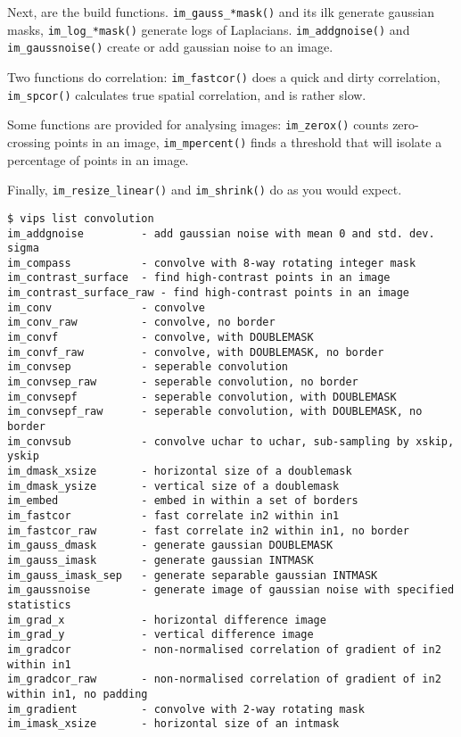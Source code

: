 Next, are the build functions. \verb+im_gauss_*mask()+ and its ilk
generate gaussian masks, \verb+im_log_*mask()+ generate logs of Laplacians.
\verb+im_addgnoise()+ and \verb+im_gaussnoise()+ create or add gaussian
noise to an image.

Two functions do correlation: \verb+im_fastcor()+ does a quick and dirty
correlation, \verb+im_spcor()+ calculates true spatial correlation, and is
rather slow.

Some functions are provided for analysing images: \verb+im_zerox()+ counts
zero-crossing points in an image, \verb+im_mpercent()+ finds a threshold
that will isolate a percentage of points in an image.

Finally, \verb+im_resize_linear()+ and \verb+im_shrink()+ do as you would
expect.

\begin{fig2}
\begin{verbatim}
$ vips list convolution
im_addgnoise         - add gaussian noise with mean 0 and std. dev. sigma
im_compass           - convolve with 8-way rotating integer mask
im_contrast_surface  - find high-contrast points in an image
im_contrast_surface_raw - find high-contrast points in an image
im_conv              - convolve
im_conv_raw          - convolve, no border
im_convf             - convolve, with DOUBLEMASK
im_convf_raw         - convolve, with DOUBLEMASK, no border
im_convsep           - seperable convolution
im_convsep_raw       - seperable convolution, no border
im_convsepf          - seperable convolution, with DOUBLEMASK
im_convsepf_raw      - seperable convolution, with DOUBLEMASK, no border
im_convsub           - convolve uchar to uchar, sub-sampling by xskip, yskip
im_dmask_xsize       - horizontal size of a doublemask
im_dmask_ysize       - vertical size of a doublemask
im_embed             - embed in within a set of borders
im_fastcor           - fast correlate in2 within in1
im_fastcor_raw       - fast correlate in2 within in1, no border
im_gauss_dmask       - generate gaussian DOUBLEMASK
im_gauss_imask       - generate gaussian INTMASK
im_gauss_imask_sep   - generate separable gaussian INTMASK
im_gaussnoise        - generate image of gaussian noise with specified statistics
im_grad_x            - horizontal difference image
im_grad_y            - vertical difference image
im_gradcor           - non-normalised correlation of gradient of in2 within in1
im_gradcor_raw       - non-normalised correlation of gradient of in2 within in1, no padding
im_gradient          - convolve with 2-way rotating mask
im_imask_xsize       - horizontal size of an intmask

\end{verbatim}
\end{fig2}
